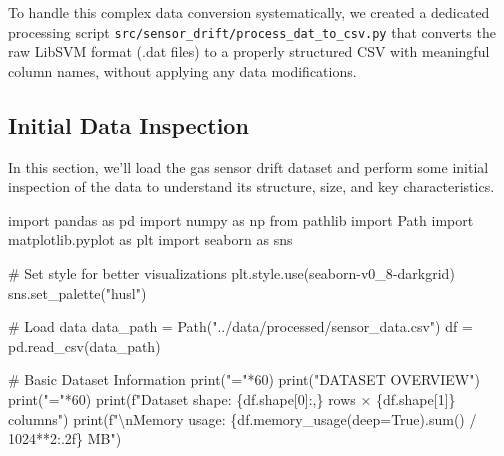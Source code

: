 \documentclass[
  letterpaper,
  DIV=11,
  numbers=noendperiod]{scrartcl}
\newenvironment{Shaded}{\begin{snugshade}}{\end{snugshade}}
\newcommand{\BuiltInTok}[1]{\textcolor[rgb]{0.00,0.23,0.31}{#1}}
\newcommand{\CharTok}[1]{\textcolor[rgb]{0.13,0.47,0.30}{#1}}
\newcommand{\CommentTok}[1]{\textcolor[rgb]{0.37,0.37,0.37}{#1}}
\newcommand{\DecValTok}[1]{\textcolor[rgb]{0.68,0.00,0.00}{#1}}
\newcommand{\ImportTok}[1]{\textcolor[rgb]{0.00,0.46,0.62}{#1}}
\newcommand{\NormalTok}[1]{\textcolor[rgb]{0.00,0.23,0.31}{#1}}
\newcommand{\OperatorTok}[1]{\textcolor[rgb]{0.37,0.37,0.37}{#1}}
\newcommand{\SpecialCharTok}[1]{\textcolor[rgb]{0.37,0.37,0.37}{#1}}
\newcommand{\SpecialStringTok}[1]{\textcolor[rgb]{0.13,0.47,0.30}{#1}}
\newcommand{\StringTok}[1]{\textcolor[rgb]{0.13,0.47,0.30}{#1}}
\newcommand{\VariableTok}[1]{\textcolor[rgb]{0.07,0.07,0.07}{#1}}
\renewenvironment{Shaded}{%
  \begin{tcolorbox}[%
    enhanced,%
    colback=codebg,%
    colframe=codebg,%
    borderline west={3pt}{0pt}{sectionblue},%
    fontupper=\small\ttfamily,%
    boxrule=0pt,%
    arc=0pt,%
    boxsep=5pt,%
    left=2mm,%
    right=2mm,%
    top=2mm,%
    bottom=2mm%
  ]%
}{%
  \end{tcolorbox}%
}
\begin{document}
To handle this complex data conversion systematically, we created a
dedicated processing script
\texttt{src/sensor\_drift/process\_dat\_to\_csv.py} that converts the
raw LibSVM format (.dat files) to a properly structured CSV with
meaningful column names, without applying any data modifications.

\subsection{Initial Data Inspection}\label{initial-data-inspection}

In this section, we'll load the gas sensor drift dataset and perform
some initial inspection of the data to understand its structure, size,
and key characteristics.

\begin{Shaded}
\begin{Highlighting}[]
\ImportTok{import}\NormalTok{ pandas }\ImportTok{as}\NormalTok{ pd}
\ImportTok{import}\NormalTok{ numpy }\ImportTok{as}\NormalTok{ np}
\ImportTok{from}\NormalTok{ pathlib }\ImportTok{import}\NormalTok{ Path}
\ImportTok{import}\NormalTok{ matplotlib.pyplot }\ImportTok{as}\NormalTok{ plt}
\ImportTok{import}\NormalTok{ seaborn }\ImportTok{as}\NormalTok{ sns}

\CommentTok{\# Set style for better visualizations}
\NormalTok{plt.style.use(}\StringTok{\textquotesingle{}seaborn{-}v0\_8{-}darkgrid\textquotesingle{}}\NormalTok{)}
\NormalTok{sns.set\_palette(}\StringTok{"husl"}\NormalTok{)}

\CommentTok{\# Load data}
\NormalTok{data\_path }\OperatorTok{=}\NormalTok{ Path(}\StringTok{"../data/processed/sensor\_data.csv"}\NormalTok{)}
\NormalTok{df }\OperatorTok{=}\NormalTok{ pd.read\_csv(data\_path)}

\CommentTok{\# Basic Dataset Information}
\BuiltInTok{print}\NormalTok{(}\StringTok{"="}\OperatorTok{*}\DecValTok{60}\NormalTok{)}
\BuiltInTok{print}\NormalTok{(}\StringTok{"DATASET OVERVIEW"}\NormalTok{)}
\BuiltInTok{print}\NormalTok{(}\StringTok{"="}\OperatorTok{*}\DecValTok{60}\NormalTok{)}
\BuiltInTok{print}\NormalTok{(}\SpecialStringTok{f"Dataset shape: }\SpecialCharTok{\{}\NormalTok{df}\SpecialCharTok{.}\NormalTok{shape[}\DecValTok{0}\NormalTok{]}\SpecialCharTok{:,\}}\SpecialStringTok{ rows × }\SpecialCharTok{\{}\NormalTok{df}\SpecialCharTok{.}\NormalTok{shape[}\DecValTok{1}\NormalTok{]}\SpecialCharTok{\}}\SpecialStringTok{ columns"}\NormalTok{)}
\BuiltInTok{print}\NormalTok{(}\SpecialStringTok{f"}\CharTok{\textbackslash{}n}\SpecialStringTok{Memory usage: }\SpecialCharTok{\{}\NormalTok{df}\SpecialCharTok{.}\NormalTok{memory\_usage(deep}\OperatorTok{=}\VariableTok{True}\NormalTok{)}\SpecialCharTok{.}\BuiltInTok{sum}\NormalTok{() }\OperatorTok{/} \DecValTok{1024}\OperatorTok{**}\DecValTok{2}\SpecialCharTok{:.2f\}}\SpecialStringTok{ MB"}\NormalTok{)}


\end{Highlighting}
\end{Shaded}
\end{document}
